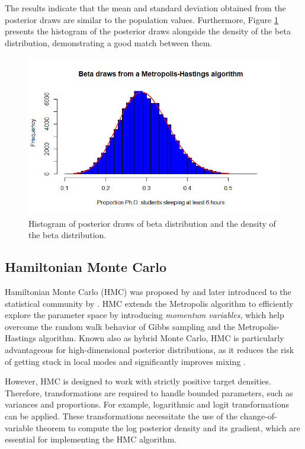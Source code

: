 The results indicate that the mean and standard deviation obtained from the posterior draws are similar to the population values. Furthermore, Figure \ref{fig53} presents the histogram of the posterior draws alongside the density of the beta distribution, demonstrating a good match between them.

\begin{figure}[!h]
	\includegraphics[width=340pt, height=200pt]{Chapters/chapter5/figures/Beta.png}
	\caption[List of figure caption goes here]{Histogram of posterior draws of beta distribution and the density of the beta distribution.}\label{fig53}
\end{figure}      

\subsection{Hamiltonian Monte Carlo}\label{sec523}

Hamiltonian Monte Carlo (HMC) was proposed by \cite{duane1987hybrid} and later introduced to the statistical community by \cite{neal1996bayesian}. HMC extends the Metropolis algorithm to efficiently explore the parameter space by introducing \textit{momentum variables}, which help overcome the random walk behavior of Gibbs sampling and the Metropolis-Hastings algorithm. Known also as hybrid Monte Carlo, HMC is particularly advantageous for high-dimensional posterior distributions, as it reduces the risk of getting stuck in local modes and significantly improves mixing \cite{neal2011mcmc}. 

However, HMC is designed to work with strictly positive target densities. Therefore, transformations are required to handle bounded parameters, such as variances and proportions. For example, logarithmic and logit transformations can be applied. These transformations necessitate the use of the change-of-variable theorem to compute the log posterior density and its gradient, which are essential for implementing the HMC algorithm.

